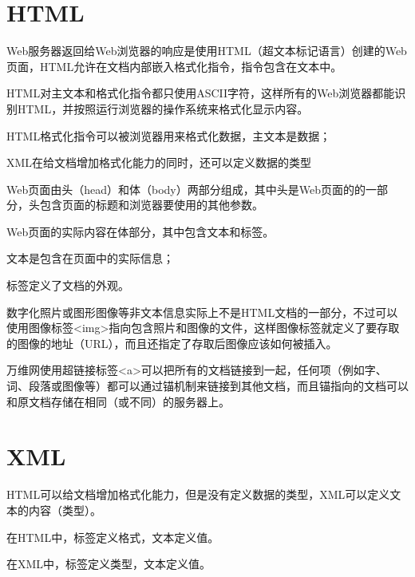 \section{HTML}

Web服务器返回给Web浏览器的响应是使用HTML（超文本标记语言）创建的Web页面，HTML允许在文档内部嵌入格式化指令，指令包含在文本中。

HTML对主文本和格式化指令都只使用ASCII字符，这样所有的Web浏览器都能识别HTML，并按照运行浏览器的操作系统来格式化显示内容。


\begin{compactitem}
\item HTML格式化指令可以被浏览器用来格式化数据，主文本是数据；
\item XML在给文档增加格式化能力的同时，还可以定义数据的类型
\end{compactitem}

Web页面由头（head）和体（body）两部分组成，其中头是Web页面的的一部分，头包含页面的标题和浏览器要使用的其他参数。

Web页面的实际内容在体部分，其中包含文本和标签。

\begin{compactitem}
\item 文本是包含在页面中的实际信息；
\item 标签定义了文档的外观。
\end{compactitem}


数字化照片或图形图像等非文本信息实际上不是HTML文档的一部分，不过可以使用图像标签<img>指向包含照片和图像的文件，这样图像标签就定义了要存取的图像的地址（URL），而且还指定了存取后图像应该如何被插入。

万维网使用超链接标签<a>可以把所有的文档链接到一起，任何项（例如字、词、段落或图像等）都可以通过锚机制来链接到其他文档，而且锚指向的文档可以和原文档存储在相同（或不同）的服务器上。



\section{XML}


HTML可以给文档增加格式化能力，但是没有定义数据的类型，XML可以定义文本的内容（类型）。

\begin{compactitem}
\item 在HTML中，标签定义格式，文本定义值。
\item 在XML中，标签定义类型，文本定义值。
\end{compactitem}

